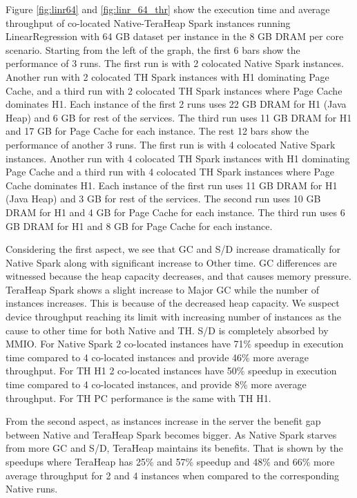 Figure \ref{fig:linr64} and \ref{fig:linr_64_thr} show the execution time and average throughput of co-located
Native-TeraHeap Spark instances running LinearRegression with 64 GB
dataset per instance in the 8 GB DRAM per core scenario.
Starting from the left of the graph, the first 6 bars show the
performance of 3 runs. The first run is with 2 colocated Native Spark instances.
Another run with 2 colocated TH Spark instances with H1 dominating Page Cache,
and a third run with 2 colocated TH Spark instances where Page Cache dominates H1.
Each instance of the first 2 runs uses 22 GB DRAM for H1 (Java Heap) and 6 GB for rest of the services.
The third run uses 11 GB DRAM for H1 and 17 GB for Page Cache for each instance.
The rest 12 bars show the performance of another 3 runs. The first run is with 4 colocated Native Spark instances.
Another run with 4 colocated TH Spark instances with H1 dominating Page Cache
and a third run with 4 colocated TH Spark instances where Page Cache dominates H1.
Each instance of the first run uses 11 GB DRAM for H1 (Java Heap) and 3 GB for rest of the services.
The second run uses 10 GB DRAM for H1 and 4 GB for Page Cache for each instance.
The third run uses 6 GB DRAM for H1 and 8 GB for Page Cache for each instance.

Considering the first aspect, we see that GC and S/D increase dramatically for Native Spark along with significant increase to Other time. GC differences are witnessed because the heap capacity decreases, and that causes memory pressure. TeraHeap Spark shows a slight increase to Major GC while the number of instances increases. This is because of the decreased heap capacity. We suspect device throughput reaching its limit with increasing number of instances as the cause to other time for both Native and TH. S/D is completely absorbed by MMIO. For Native Spark 2 co-located instances have 71\% speedup in execution time compared to 4 co-located instances and provide 46\% more average throughput. For TH H1 2 co-located instances have 50\% speedup in execution time compared to 4 co-located instances, and provide 8\% more average throughput. For TH PC performance is the same with TH H1.

From the second aspect, as instances increase in the server the benefit gap between Native and TeraHeap Spark becomes bigger. As Native Spark starves from more GC and S/D, TeraHeap maintains its benefits. That is shown by the speedups where TeraHeap has 25\% and 57\% speedup and 48\% and 66\% more average throughput for 2 and 4 instances when compared to the corresponding Native runs.

